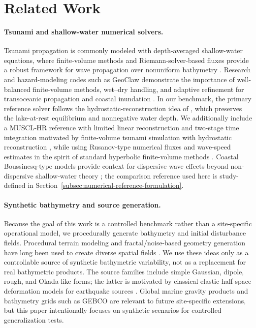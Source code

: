 \section{Related Work}

\paragraph{Tsunami and shallow-water numerical solvers.}
Tsunami propagation is commonly modeled with depth-averaged shallow-water equations, where finite-volume methods and Riemann-solver-based fluxes provide a robust framework for wave propagation over nonuniform bathymetry \citep{leveque2002finite,toro2009riemann,bradford2002flooding}. Research and hazard-modeling codes such as GeoClaw demonstrate the importance of well-balanced finite-volume methods, wet--dry handling, and adaptive refinement for transoceanic propagation and coastal inundation \citep{leveque2011tsunami,berger2011geoclaw}. In our benchmark, the primary reference solver follows the hydrostatic-reconstruction idea of \citet{audusse2004hydrostatic}, which preserves the lake-at-rest equilibrium and nonnegative water depth. We additionally include a MUSCL-HR reference with limited linear reconstruction and two-stage time integration motivated by finite-volume tsunami simulation with hydrostatic reconstruction \citep{clain2016secondorder}, while using Rusanov-type numerical fluxes and wave-speed estimates in the spirit of standard hyperbolic finite-volume methods \citep{toro2009riemann,toro2026rusanov}. Coastal Boussinesq-type models provide context for dispersive wave effects beyond non-dispersive shallow-water theory \citep{shi2012boussinesq}; the comparison reference used here is study-defined in Section~\ref{subsec:numerical-reference-formulation}.

\paragraph{Synthetic bathymetry and source generation.}
Because the goal of this work is a controlled benchmark rather than a site-specific operational model, we procedurally generate bathymetry and initial disturbance fields. Procedural terrain modeling and fractal/noise-based geometry generation have long been used to create diverse spatial fields \citep{musgrave1989terrain}. We use these ideas only as a controllable source of synthetic bathymetric variability, not as a replacement for real bathymetric products. The source families include simple Gaussian, dipole, rough, and Okada-like forms; the latter is motivated by classical elastic half-space deformation models for earthquake sources \citep{okada1985surface}. Global marine gravity products \citep{sandwell2014gravity} and bathymetry grids such as GEBCO \citep{gebco2026} are relevant to future site-specific extensions, but this paper intentionally focuses on synthetic scenarios for controlled generalization tests.

